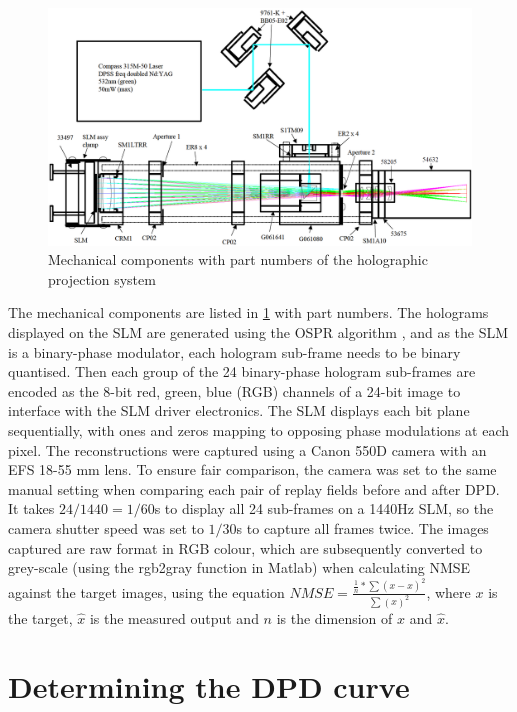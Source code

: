 \begin{figure}[H]
    \centering
    \includegraphics[width=\textwidth]{holographic_projector.png}
    \caption{Mechanical components with part numbers of the holographic projection system \cite{Freeman2009}}
    \label{fig:holographic_projector}
\end{figure}

The mechanical components are listed in \cref{fig:holographic_projector} with part numbers. The holograms displayed on the SLM are generated using the OSPR algorithm \cite{Cable2004}, and as the SLM is a binary-phase modulator, each hologram sub-frame needs to be binary quantised. Then each group of the 24 binary-phase hologram sub-frames are encoded as the 8-bit red, green, blue (RGB) channels of a 24-bit image to interface with the SLM driver electronics. The SLM displays each bit plane sequentially, with ones and zeros mapping to opposing phase modulations at each pixel. The reconstructions were captured using a Canon 550D camera with an EFS 18-55 mm lens. To ensure fair comparison, the camera was set to the same manual setting when comparing each pair of replay fields before and after DPD. It takes $24/1440=1/60$s to display all 24 sub-frames on a 1440Hz SLM, so the camera shutter speed was set to $1/30$s to capture all frames twice. The images captured are raw format in RGB colour, which are subsequently converted to grey-scale (using the rgb2gray function in Matlab\cite{MATLAB}) when calculating NMSE against the target images, using the equation $NMSE = \frac{\frac{1}{n} * \sum (x - \hat{x})^2}{\sum (x)^2}$, where $x$ is the target, $\hat{x}$ is the measured output and $n$ is the dimension of $x$ and $\hat{x}$.



\section{Determining the DPD curve}

